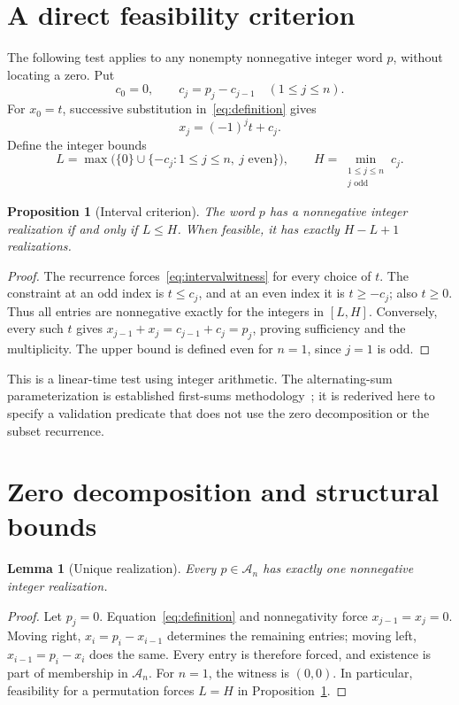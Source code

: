 \documentclass[11pt]{article}
\newtheorem{lemma}[theorem]{Lemma}
\newtheorem{proposition}[theorem]{Proposition}
\theoremstyle{definition}
\theoremstyle{remark}
\newcommand{\An}{\mathcal A_n}
\begin{document}
\section{A direct feasibility criterion}
\label{sec:criterion}

The following test applies to any nonempty nonnegative integer word $p$,
without locating a zero. Put
\begin{equation}
 c_0=0,\qquad c_j=p_j-c_{j-1}\quad(1\leq j\leq n).
 \label{eq:c}
\end{equation}
For $x_0=t$, successive substitution in~\eqref{eq:definition} gives
\begin{equation}
 x_j=(-1)^j t+c_j.
 \label{eq:intervalwitness}
\end{equation}
Define the integer bounds
\begin{equation}
 L=\max\bigl(\{0\}\cup\{-c_j:1\leq j\leq n,\ j\text{ even}\}\bigr),
 \qquad H=\min_{\substack{1\leq j\leq n\\j\text{ odd}}}c_j.
 \label{eq:interval}
\end{equation}

\begin{proposition}[Interval criterion]
\label{prop:interval}
The word $p$ has a nonnegative integer realization if and only if $L\leq H$.
When feasible, it has exactly $H-L+1$ realizations.
\end{proposition}
\begin{proof}
The recurrence forces~\eqref{eq:intervalwitness} for every choice of $t$.
The constraint at an odd index is $t\leq c_j$, and at an even index it is
$t\geq-c_j$; also $t\geq0$. Thus all entries are nonnegative exactly for
the integers in $[L,H]$. Conversely, every such $t$ gives
$x_{j-1}+x_j=c_{j-1}+c_j=p_j$, proving sufficiency and the multiplicity.
The upper bound is defined even for $n=1$, since $j=1$ is odd.
\end{proof}

This is a linear-time test using integer arithmetic. The alternating-sum
parameterization is established first-sums methodology~\cite{a391643,a391645,a391621};
it is rederived here to specify a validation predicate that does not use
the zero decomposition or the subset recurrence.

\section{Zero decomposition and structural bounds}
\label{sec:tails}

\begin{lemma}[Unique realization]
\label{lem:unique}
Every $p\in\An$ has exactly one nonnegative integer realization.
\end{lemma}
\begin{proof}
Let $p_j=0$. Equation~\eqref{eq:definition} and nonnegativity force
$x_{j-1}=x_j=0$. Moving right, $x_i=p_i-x_{i-1}$ determines the
remaining entries; moving left, $x_{i-1}=p_i-x_i$ does the same.
Every entry is therefore forced, and existence is part of membership in
$\An$. For $n=1$, the witness is $(0,0)$. In particular, feasibility
for a permutation forces $L=H$ in Proposition~\ref{prop:interval}.
\end{proof}
\end{document}

